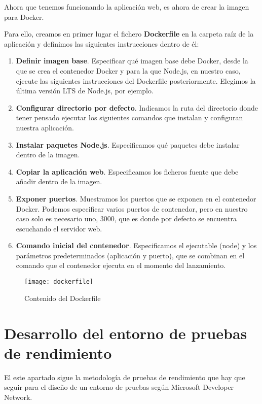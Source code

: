 Ahora que tenemos funcionando la aplicación web, es ahora de crear la imagen para Docker.

Para ello, creamos en primer lugar el fichero \textbf{Dockerfile} en la carpeta raíz de la aplicación y definimos las siguientes instrucciones dentro de él:

\begin{enumerate}
  \item \textbf{Definir imagen base}. Especificar qué imagen base debe Docker, desde la que se crea el contenedor Docker y para la que Node.js, en nuestro caso, ejecute las siguientes instrucciones del Dockerfile posteriormente. Elegimos la última versión LTS de Node.js, por ejemplo.
  \item \textbf{Configurar directorio por defecto}. Indicamos la ruta del directorio donde tener pensado ejecutar los siguientes comandos que instalan y configuran nuestra aplicación.
  \item \textbf{Instalar paquetes Node.js}. Especificamos qué paquetes debe instalar dentro de la imagen.
  \item \textbf{Copiar la aplicación web}. Especificamos los ficheros fuente que debe añadir dentro de la imagen.
  \item \textbf{Exponer puertos}. Muestramos los puertos que se exponen en el contenedor Docker. Podemos especificar varios puertos de contenedor, pero en nuestro caso solo es necesario uno, 3000, que es donde por defecto se encuentra escuchando el servidor web.
  \item \textbf{Comando inicial del contenedor}. Especificamos el ejecutable (node) y los parámetros predeterminados (aplicación y puerto), que se combinan en el comando que el contenedor ejecuta en el momento del lanzamiento.
\end{enumerate}

\begin{figure}[htp!]
  \centering
  \texttt{[image: dockerfile]}
  \caption{Contenido del Dockerfile}
  \label{fig:dockerfile}
\end{figure}

\section{Desarrollo del entorno de pruebas de rendimiento}

El este apartado sigue la metodología de pruebas de rendimiento que hay que seguir para el diseño de un entorno de pruebas según Microsoft Developer Network.

